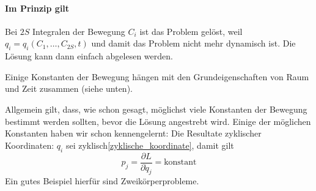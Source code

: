 \documentclass[oneside]{book}
\theoremstyle{definition}
\newcommand{\ffpartial}[2]{\frac{\partial #1}{\partial #2}}
\begin{document}
\paragraph{Im Prinzip gilt} Bei $2S$ Integralen der Bewegung $C_i$ ist das Problem gelöst, weil $q_i = q_i(C_1, \dots, C_{2S}, t)$ und damit das Problem nicht mehr dynamisch ist. Die Lösung kann dann einfach abgelesen werden.

Einige Konstanten der Bewegung hängen mit den Grundeigenschaften von Raum und Zeit zusammen (siehe unten).

Allgemein gilt, dass, wie schon gesagt, möglichst viele Konstanten der Bewegung bestimmt werden sollten, bevor die Lösung angestrebt wird. Einige der möglichen Konstanten haben wir schon kennengelernt: Die Resultate zyklischer Koordinaten: $q_i$ sei zyklisch\ref{zyklische_koordinate}, damit gilt
$$p_j = \ffpartial{L}{\dot{q}_j} = \text{konstant}$$
Ein gutes Beispiel hierfür sind Zweikörperprobleme.
\end{document}
